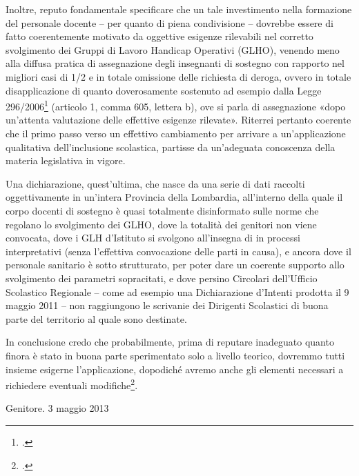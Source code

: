 Inoltre, reputo fondamentale specificare che un tale investimento nella formazione del personale docente – per quanto di piena condivisione – dovrebbe essere di fatto coerentemente motivato da oggettive esigenze rilevabili nel corretto svolgimento dei Gruppi di Lavoro Handicap Operativi (GLHO), venendo meno alla diffusa pratica di assegnazione degli insegnanti di sostegno con rapporto nel migliori casi di 1/2 e in totale omissione delle richiesta di deroga, ovvero in totale disapplicazione di quanto doverosamente sostenuto ad esempio dalla Legge 296/2006\footcite{Legge_296_2006} (articolo 1, comma 605, lettera b), ove si parla di assegnazione «dopo un'attenta valutazione delle effettive esigenze rilevate».
Riterrei pertanto coerente che il primo passo verso un effettivo cambiamento per arrivare a un'applicazione qualitativa dell'inclusione scolastica, partisse da un'adeguata conoscenza della materia legislativa in vigore.

Una dichiarazione, quest'ultima, che nasce da una serie di dati raccolti oggettivamente in un'intera Provincia della Lombardia, all'interno della quale il corpo docenti di sostegno è quasi totalmente disinformato sulle norme che regolano lo svolgimento dei GLHO, dove la totalità dei genitori non viene convocata, dove i GLH d'Istituto si svolgono all'insegna di in processi interpretativi (senza l'effettiva convocazione delle parti in causa), e ancora dove il personale sanitario è sotto strutturato, per poter dare un coerente supporto allo svolgimento dei parametri sopracitati, e dove persino Circolari dell'Ufficio Scolastico Regionale – come ad esempio una Dichiarazione d'Intenti prodotta il 9 maggio 2011 – non raggiungono le scrivanie dei Dirigenti Scolastici di buona parte del territorio al quale sono destinate.

In conclusione credo che probabilmente, prima di reputare inadeguato quanto finora è stato in buona parte sperimentato solo a livello teorico, dovremmo tutti insieme esigerne l'applicazione, dopodiché avremo anche gli elementi necessari a richiedere eventuali modifiche\footcite{Brogi2013}.


Genitore. 3 maggio 2013
